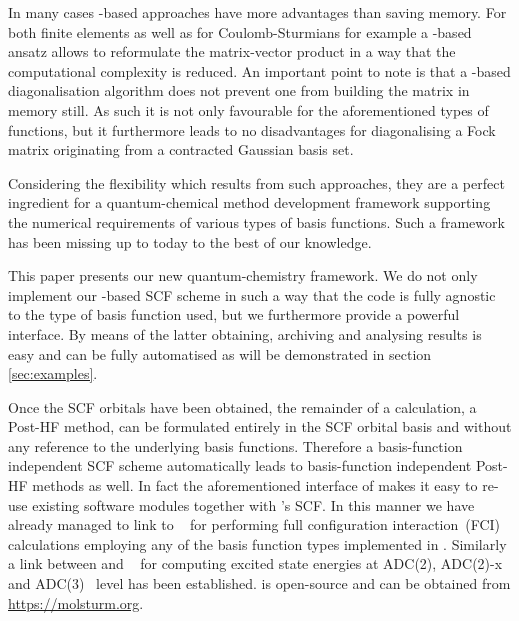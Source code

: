 In many cases \contraction-based approaches
have more advantages than saving memory.
For both finite elements as well as for Coulomb-Sturmians
for example a \contraction-based ansatz
allows to reformulate the matrix-vector product in a way
that the computational complexity is reduced.
An important point to note is that
a \contraction-based diagonalisation algorithm
does not prevent one from building the matrix in memory still.
As such it is not only favourable for the aforementioned
types of functions,
but it furthermore leads to no disadvantages
for diagonalising a Fock matrix originating from
a contracted Gaussian basis set.

Considering the flexibility which results from such approaches,
they are a perfect ingredient for
a quantum-chemical method development framework
supporting the numerical requirements of various types of basis functions.
Such a framework has been missing up to today to the best of our knowledge.

This paper presents our new \molsturm quantum-chemistry framework.
We do not only implement our \contraction-based SCF scheme
in such a way that the code is fully agnostic to the type of basis function used,
but we furthermore provide a powerful \python interface.
By means of the latter obtaining, archiving and analysing results
is easy and can be fully automatised
as will be demonstrated in section \ref{sec:examples}.

Once the SCF orbitals have been obtained,
the remainder of a calculation, \eg a Post-HF method,
can be formulated entirely in the SCF orbital basis
and without any reference to the underlying basis functions.
Therefore a basis-function independent SCF scheme automatically
leads to basis-function independent Post-HF methods as well.
In fact the aforementioned \python interface of \molsturm
makes it easy to re-use existing software modules
together with \molsturm's SCF.
In this manner we have already managed to link \molsturm to \pyscf~\cite{Sun2017}
for performing full configuration interaction~(FCI) calculations employing any of the
basis function types implemented in \molsturm.
Similarly a link between \molsturm and \adcman~\cite{Wormit2014}
for computing excited state energies at ADC(2),
ADC(2)-x and ADC(3)~\cite{Schirmer1982,Trofimov1999} level
has been established.
\molsturm is open-source and can be obtained from \url{https://molsturm.org}.


